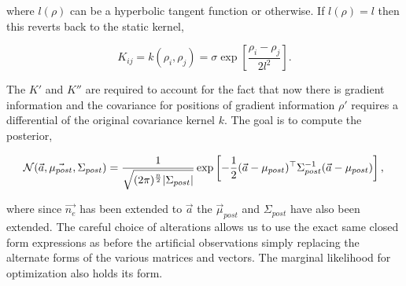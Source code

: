 \noindent where $l(\rho)$ can be a hyperbolic tangent function or otherwise. If $l(\rho) = l$ then this reverts back to the static kernel,

\begin{equation}
K_{ij} = k(\rho_i, \rho_j) = \sigma \exp\left[{\frac{\rho_i - \rho_j}{2l^2}}\right].
\end{equation}

\noindent The $K'$  and $K''$ are required to account for the fact that now there is gradient information and the covariance for positions of gradient information $\rho'$ requires a differential of the original covariance kernel $k$. The goal is to compute the posterior,  

\begin{equation}
\mathcal{N}(\vec{a}, \vec{\mu_{post}}, \Sigma_{post}) = \frac{1}{\sqrt{(2\pi)^{\frac{n}{2}}|\Sigma_{post}|}} \exp \left[{{-\frac{1}{2}(\vec{a}-\mu_{post})^\top\Sigma_{post}^{-1}(\vec{a}-\mu_{post})}}\right],\\
\end{equation}

\noindent where since $\vec{n_e}$ has been extended to $\vec a$ the $\vec \mu_{post}$ and $\Sigma_{post}$ have also been extended. The careful choice of alterations allows us to use the exact same closed form expressions as before the artificial observations simply replacing the alternate forms of the various matrices and vectors. The marginal likelihood for optimization also holds its form.